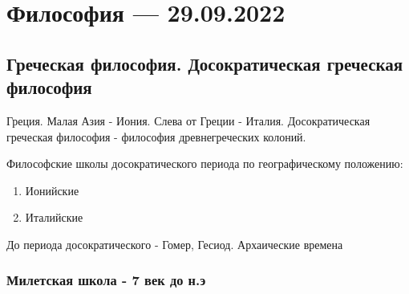 \documentclass{article}
\begin{document}
\pagebreak
\section{Философия — 29.09.2022}

\subsection{Греческая философия. Досократическая греческая философия}

\begin{flushleft}
Греция. Малая Азия - Иония. Слева от Греции - Италия. Досократическая греческая философия - философия древнегреческих колоний.

Философские школы досократического периода по географическому положению:

\begin{enumerate}
    \item Ионийские
    \item Италийские
\end{enumerate}

До периода досократического - Гомер, Гесиод. Архаические времена

\end{flushleft}

\subsubsection{Милетская школа - 7 век до н.э}
\end{document}
